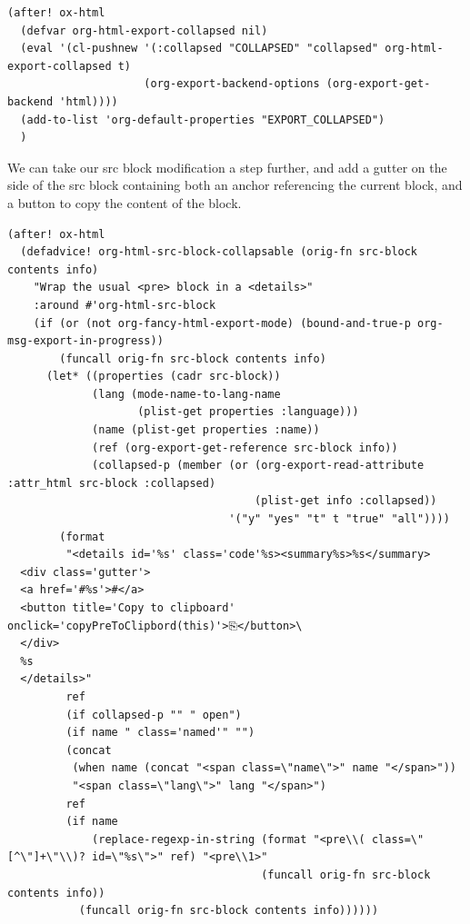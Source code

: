 \documentclass[11pt]{article}
\begin{document}
\begin{verbatim}
(after! ox-html
  (defvar org-html-export-collapsed nil)
  (eval '(cl-pushnew '(:collapsed "COLLAPSED" "collapsed" org-html-export-collapsed t)
                     (org-export-backend-options (org-export-get-backend 'html))))
  (add-to-list 'org-default-properties "EXPORT_COLLAPSED")
  )
\end{verbatim}

We can take our src block modification a step further, and add a gutter on the
side of the src block containing both an anchor referencing the current block,
and a button to copy the content of the block.

\begin{verbatim}
(after! ox-html
  (defadvice! org-html-src-block-collapsable (orig-fn src-block contents info)
    "Wrap the usual <pre> block in a <details>"
    :around #'org-html-src-block
    (if (or (not org-fancy-html-export-mode) (bound-and-true-p org-msg-export-in-progress))
        (funcall orig-fn src-block contents info)
      (let* ((properties (cadr src-block))
             (lang (mode-name-to-lang-name
                    (plist-get properties :language)))
             (name (plist-get properties :name))
             (ref (org-export-get-reference src-block info))
             (collapsed-p (member (or (org-export-read-attribute :attr_html src-block :collapsed)
                                      (plist-get info :collapsed))
                                  '("y" "yes" "t" t "true" "all"))))
        (format
         "<details id='%s' class='code'%s><summary%s>%s</summary>
  <div class='gutter'>
  <a href='#%s'>#</a>
  <button title='Copy to clipboard' onclick='copyPreToClipbord(this)'>⎘</button>\
  </div>
  %s
  </details>"
         ref
         (if collapsed-p "" " open")
         (if name " class='named'" "")
         (concat
          (when name (concat "<span class=\"name\">" name "</span>"))
          "<span class=\"lang\">" lang "</span>")
         ref
         (if name
             (replace-regexp-in-string (format "<pre\\( class=\"[^\"]+\"\\)? id=\"%s\">" ref) "<pre\\1>"
                                       (funcall orig-fn src-block contents info))
           (funcall orig-fn src-block contents info))))))


\end{verbatim}
\end{document}
